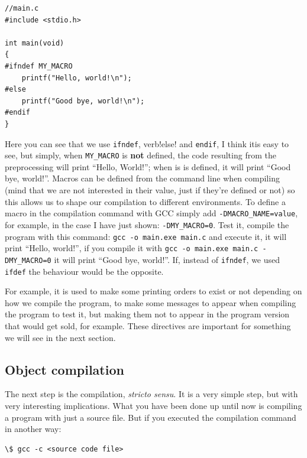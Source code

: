 \documentclass[a4paper]{article}
\begin{document}
\noindent
\begin{minipage}[H]{\linewidth}
\mbox{}
\begin{lstlisting}[style=C,
caption={Uso de directivas \texttt{ifdef} e \texttt{ifndef}},
label={lst:ifdefAndIfndef}]
//main.c
#include <stdio.h>

int main(void)
{
#ifndef MY_MACRO
    printf("Hello, world!\n");
#else
    printf("Good bye, world!\n");
#endif
}
\end{lstlisting}
\end{minipage}

Here you can see that we use \verb!ifndef!, verb!else! and \verb!endif!, I think
itis easy to see, but simply, when \verb!MY_MACRO! is \textbf{not} defined,
the code resulting from the preprocessing will print ``Hello, World!''; when is
is defined, it will print ``Good bye, world!''. Macros can be defined from the
command line when compiling (mind that we are not interested in their value,
just if they're defined or not) so this allows us to shape our compilation to
different environments. To define a macro in the compilation command with GCC
simply add \verb!-DMACRO_NAME=value!, for example, in the case I have just
shown: \verb!-DMY_MACRO=0!. Test it, compile the program with this command:
\verb!gcc -o main.exe main.c! and execute it, it will print ``Hello, world!'',
if you compile it with \verb!gcc -o main.exe main.c -DMY_MACRO=0! it will print
``Good bye, world!''. If, instead of \verb!ifndef!, we used \verb!ifdef! the
behaviour would be the opposite.

For example, it is used to make some printing orders to exist or not depending
on how we compile the program, to make some messages to appear when compiling
the program to test it, but making them not to appear in the program version
that would get sold, for example. These directives are important for something
we will see in the next section.

\subsection{Object compilation}
The next step is the compilation, \textit{stricto sensu}. It is a very simple
step, but with very interesting implications. What you have been done up until
now is compiling a program with just a source file. But if you executed the
compilation command in another way:
\begin{lstlisting}[style=terminalStyle]
\$ gcc -c <source code file>
\end{lstlisting}
\end{document}
